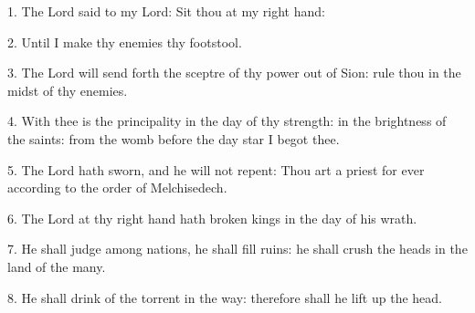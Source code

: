 1. The Lord said to my Lord: Sit thou at my right hand:

2. Until I make thy enemies thy footstool.
 
3. The Lord will send forth the sceptre of thy power out of Sion: rule thou in the midst of thy enemies.
 
4. With thee is the principality in the day of thy strength: in the brightness of the saints:
 from the womb before the day star I begot thee.
 
5. The Lord hath sworn, and he will not repent: Thou art a priest for ever according to the order of Melchisedech.
 
6. The Lord at thy right hand hath broken kings in the day of his wrath.

7. He shall judge among nations, he shall fill ruins: he shall crush the heads in the land of the many.

8. He shall drink of the torrent in the way: therefore shall he lift up the head. 